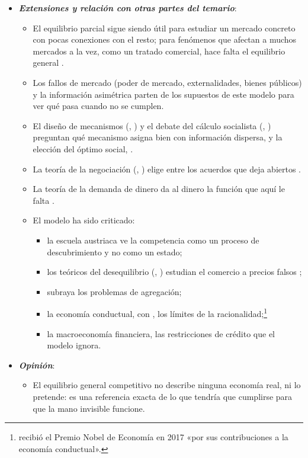 \documentclass[11pt]{article}
\begin{document}
\begin{itemize}
\begin{itemize}
  \item También lo son la teoría del comercio internacional  y la economía del clima , y los modelos computables se usan para evaluar acuerdos comerciales, impuestos y políticas climáticas.
  \end{itemize}
\item \textbf{\emph{Extensiones y relación con otras partes del temario}}:
  \begin{itemize}
  \item El equilibrio parcial sigue siendo útil para estudiar un mercado concreto con pocas conexiones con el resto; para fenómenos que afectan a muchos mercados a la vez, como un tratado comercial, hace falta el equilibrio general .
  \item Los fallos de mercado (poder de mercado, externalidades, bienes públicos)  y la información asimétrica  parten de los supuestos de este modelo para ver qué pasa cuando no se cumplen.
  \item El diseño de mecanismos (, ) y el debate del cálculo socialista (, ) preguntan qué mecanismo asigna bien con información dispersa, y la elección del óptimo social, .
  \item La teoría de la negociación (, ) elige entre los acuerdos que  deja abiertos .
  \item La teoría de la demanda de dinero da al dinero la función que aquí le falta .
  \item El modelo ha sido criticado:
    \begin{itemize}
    \item la escuela austriaca ve la competencia como un proceso de descubrimiento y no como un estado;
    \item los teóricos del desequilibrio (, ) estudian el comercio a precios falsos ;
    \item \textcite{Kirman1992Whom} subraya los problemas de agregación;
    \item la economía conductual, con , los límites de la racionalidad;\footnote{ recibió el Premio Nobel de Economía en 2017 «por sus contribuciones a la economía conductual»\nocite{Nobel2017Thaler}.}
    \item la macroeconomía financiera, las restricciones de crédito que el modelo ignora.
    \end{itemize}
  \end{itemize}
\item \textbf{\emph{Opinión}}:
  \begin{itemize}
  \item El equilibrio general competitivo no describe ninguna economía real, ni lo pretende: es una referencia exacta de lo que tendría que cumplirse para que la mano invisible funcione.


\end{itemize}
\end{itemize}
\end{document}
